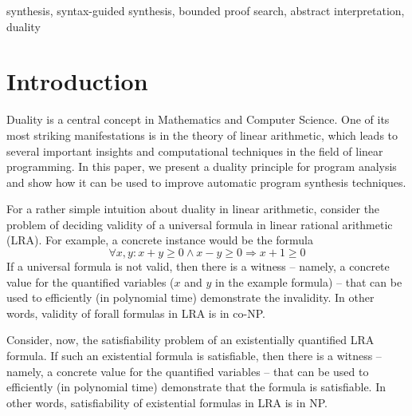 \documentclass[preprint]{sig-alternate-05-2015}
\begin{document}


\keywords
synthesis, syntax-guided synthesis, bounded proof search, abstract interpretation, duality



\section{Introduction}
\label{sec:intro}

Duality is a central concept in Mathematics and Computer Science.
One of its most striking manifestations is in the
theory of linear arithmetic, which leads to 
several important insights and computational techniques
in the field of linear programming.
In this paper, we present a duality principle for program analysis
and show how it can be used to improve automatic program synthesis
techniques.

For a rather simple intuition about duality in linear arithmetic, 
consider the problem of deciding
validity of a universal formula in linear rational arithmetic (LRA).
For example, a concrete instance would be the formula
$$
 \forall{x,y}: x+y\geq 0\wedge x-y\geq 0 \Rightarrow x+1 \geq 0
$$
If a universal formula is not valid, then there is a witness -- namely,
a concrete value for the quantified variables ($x$ and $y$ in the 
example formula) -- that can be used to efficiently (in polynomial time)
demonstrate the invalidity. 
In other words, %
validity of forall formulas
in LRA is in co-NP.

Consider, now, the satisfiability problem of an existentially
quantified LRA formula.
If such an existential formula is satisfiable, then there is a witness -- 
namely, a concrete value for the quantified variables -- that can be used 
to efficiently (in polynomial time) demonstrate that the formula
is satisfiable. 
In other words, %
satisfiability of existential formulas
in LRA is in NP.
\end{document}

